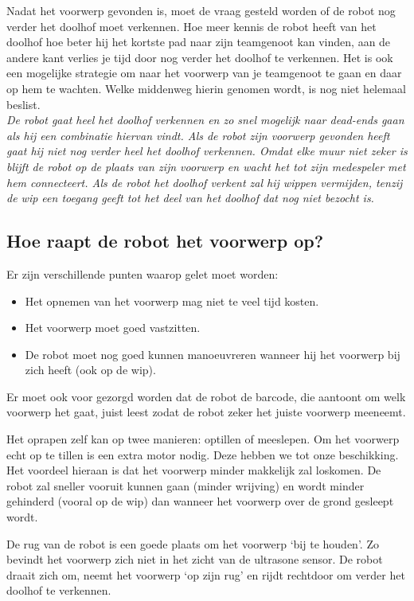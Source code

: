 \documentclass{peno}
\begin{document}
Nadat het voorwerp gevonden is, moet de vraag gesteld worden of de robot nog verder het doolhof moet verkennen. Hoe meer kennis de robot heeft van het doolhof hoe beter hij het kortste pad naar zijn teamgenoot kan vinden, aan de andere kant verlies je tijd door nog verder het doolhof te verkennen. Het is ook een mogelijke strategie om naar het voorwerp van je teamgenoot te gaan en daar op hem te wachten. Welke middenweg hierin genomen wordt, is nog niet helemaal beslist.\\


\textit{De robot gaat heel het doolhof verkennen en zo snel mogelijk naar dead-ends gaan als hij een combinatie hiervan vindt. Als de robot zijn voorwerp gevonden heeft gaat hij niet nog verder heel het doolhof verkennen. Omdat elke muur niet zeker is blijft de robot op de plaats van zijn voorwerp en wacht het tot zijn medespeler met hem connecteert. Als de robot het doolhof verkent zal hij wippen vermijden, tenzij de wip een toegang geeft tot het deel van het doolhof dat nog niet bezocht is.}

\subsection*{Hoe raapt de robot het voorwerp op?}
Er zijn verschillende punten waarop gelet moet worden:
\begin{itemize}
\item Het opnemen van het voorwerp mag niet te veel tijd kosten.
\item Het voorwerp moet goed vastzitten.
\item De robot moet nog goed kunnen manoeuvreren wanneer hij het voorwerp bij zich heeft (ook op de wip).
\end{itemize} 

Er moet ook voor gezorgd worden dat de robot de barcode, die aantoont om welk voorwerp het gaat, juist leest zodat de robot zeker het juiste voorwerp meeneemt.

Het oprapen zelf kan op twee manieren: optillen of meeslepen. Om het voorwerp echt op te tillen is een extra motor nodig. Deze hebben we tot onze beschikking. Het voordeel hieraan is dat het voorwerp minder makkelijk zal loskomen. De robot zal sneller vooruit kunnen gaan (minder wrijving) en wordt minder gehinderd (vooral op de wip) dan wanneer het voorwerp over de grond gesleept wordt.

De rug van de robot is een goede plaats om het voorwerp `bij te houden'. Zo bevindt het voorwerp zich niet in het zicht van de ultrasone sensor. De robot draait zich om, neemt het voorwerp `op zijn rug' en rijdt rechtdoor om verder het doolhof te verkennen.\\
\end{document}
